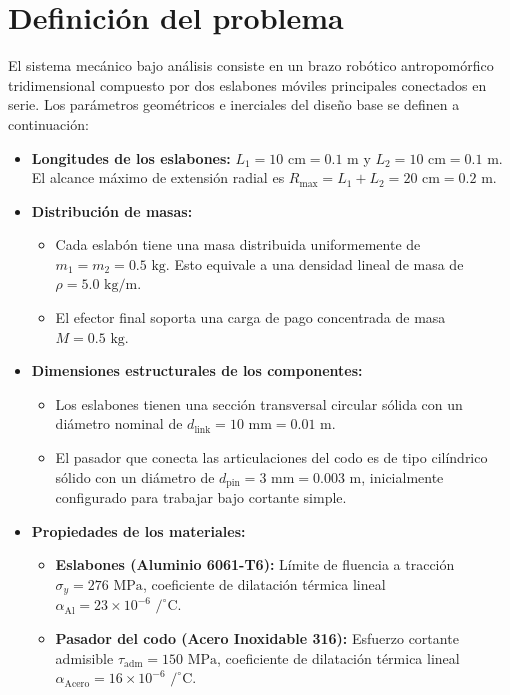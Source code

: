 \documentclass[11pt,a4paper]{article}
\begin{document}
\section{Definición del problema}
El sistema mecánico bajo análisis consiste en un brazo robótico antropomórfico tridimensional compuesto por dos eslabones móviles principales conectados en serie. Los parámetros geométricos e inerciales del diseño base se definen a continuación:
\begin{itemize}
    \item \textbf{Longitudes de los eslabones:} $L_1 = 10\text{ cm} = 0.1\text{ m}$ y $L_2 = 10\text{ cm} = 0.1\text{ m}$. El alcance máximo de extensión radial es $R_{\text{max}} = L_1 + L_2 = 20\text{ cm} = 0.2\text{ m}$.
    \item \textbf{Distribución de masas:}
    \begin{itemize}
        \item Cada eslabón tiene una masa distribuida uniformemente de $m_1 = m_2 = 0.5\text{ kg}$. Esto equivale a una densidad lineal de masa de $\rho = 5.0\text{ kg/m}$.
        \item El efector final soporta una carga de pago concentrada de masa $M = 0.5\text{ kg}$.
    \end{itemize}
    \item \textbf{Dimensiones estructurales de los componentes:}
    \begin{itemize}
        \item Los eslabones tienen una sección transversal circular sólida con un diámetro nominal de $d_{\text{link}} = 10\text{ mm} = 0.01\text{ m}$.
        \item El pasador que conecta las articulaciones del codo es de tipo cilíndrico sólido con un diámetro de $d_{\text{pin}} = 3\text{ mm} = 0.003\text{ m}$, inicialmente configurado para trabajar bajo cortante simple.
    \end{itemize}
    \item \textbf{Propiedades de los materiales:}
    \begin{itemize}
        \item \textbf{Eslabones (Aluminio 6061-T6):} Límite de fluencia a tracción $\sigma_y = 276\text{ MPa}$, coeficiente de dilatación térmica lineal $\alpha_{\text{Al}} = 23 \times 10^{-6}\text{ /}^\circ\text{C}$.
        \item \textbf{Pasador del codo (Acero Inoxidable 316):} Esfuerzo cortante admisible $\tau_{\text{adm}} = 150\text{ MPa}$, coeficiente de dilatación térmica lineal $\alpha_{\text{Acero}} = 16 \times 10^{-6}\text{ /}^\circ\text{C}$.
    \end{itemize}
\end{itemize}
\end{document}
